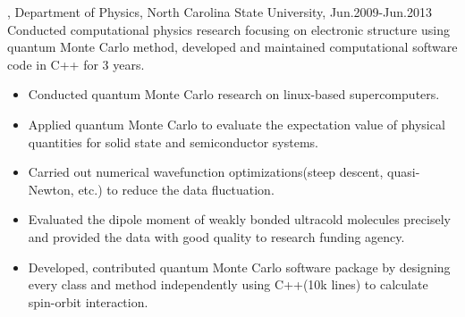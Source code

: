 \documentclass[11pt]{article} %
\begin{document}
, Department of Physics, North Carolina State University, Jun.2009-Jun.2013\\
\noindent Conducted computational physics research focusing on electronic structure using quantum Monte Carlo method, developed and maintained computational software code in C++ for 3 years.\\
\begin{itemize}
 \item Conducted quantum Monte Carlo research on linux-based supercomputers.\\
\vspace{-4mm}
  \item Applied quantum Monte Carlo to evaluate the expectation value of physical quantities for solid state and semiconductor systems. \\

\vspace{-4mm}
  \item Carried out numerical wavefunction optimizations(steep descent, quasi-Newton, etc.) to reduce the data fluctuation. \\
  \vspace{-4mm}
  \item Evaluated the dipole moment of weakly bonded ultracold molecules precisely and  provided
the data with good quality to research funding agency.\\
\vspace{-4mm}
  \item Developed, contributed quantum Monte Carlo software package by designing every class and method independently using C++(10k lines) to calculate spin-orbit interaction.\\




\end{itemize}
\end{document}
